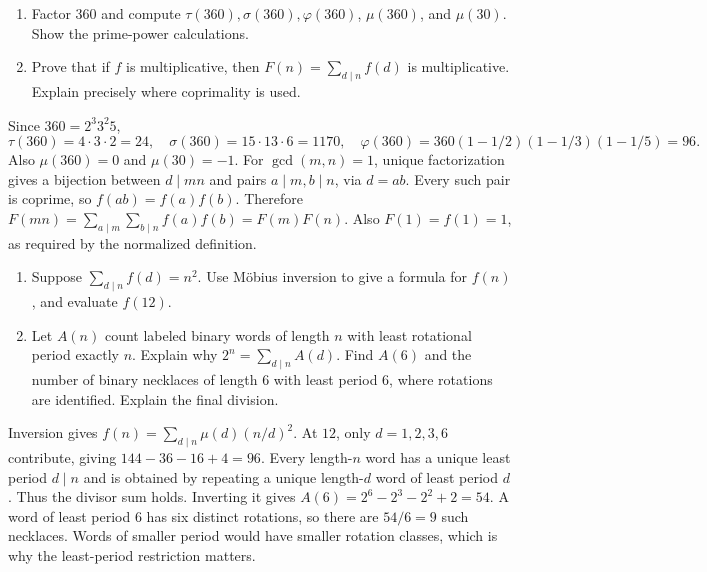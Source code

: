 \begin{enumerate}
\item Factor $360$ and compute $\tau(360),\sigma(360),\varphi(360)$,
$\mu(360)$, and $\mu(30)$. Show the prime-power calculations. 
\item Prove that if $f$ is multiplicative, then
$F(n)=\sum_{d\mid n}f(d)$ is multiplicative. Explain precisely where
coprimality is used. 
\end{enumerate}
\begin{solution}
Since $360=2^3 3^2 5$,
\[
\tau(360)=4\cdot3\cdot2=24,\quad
\sigma(360)=15\cdot13\cdot6=1170,\quad
\varphi(360)=360(1-1/2)(1-1/3)(1-1/5)=96.
\]
Also $\mu(360)=0$ and $\mu(30)=-1$.
For $\gcd(m,n)=1$, unique factorization gives a bijection
between $d\mid mn$ and pairs $a\mid m,b\mid n$, via $d=ab$.
Every such pair is coprime, so $f(ab)=f(a)f(b)$. Therefore
$F(mn)=\sum_{a\mid m}\sum_{b\mid n}f(a)f(b)=F(m)F(n)$.
Also $F(1)=f(1)=1$, as required by the normalized definition.
\end{solution}

\studentbreak
{}
\begin{enumerate}
\item Suppose $\sum_{d\mid n}f(d)=n^2$. Use M\"obius inversion to
give a formula for $f(n)$, and evaluate $f(12)$. 
\item Let $A(n)$ count labeled binary words of length $n$ with least
rotational period exactly $n$. Explain why
$2^n=\sum_{d\mid n}A(d)$. Find $A(6)$ and the number of binary necklaces
of length $6$ with least period $6$, where rotations are identified.
Explain the final division. 
\end{enumerate}
\begin{solution}
Inversion gives $f(n)=\sum_{d\mid n}\mu(d)(n/d)^2$.
At $12$, only $d=1,2,3,6$ contribute, giving $144-36-16+4=96$.
Every length-$n$ word has a unique least period $d\mid n$ and is obtained
by repeating a unique length-$d$ word of least period $d$. Thus the
divisor sum holds. Inverting it gives
$A(6)=2^6-2^3-2^2+2=54$.
A word of least period $6$ has six distinct rotations, so there are
$54/6=9$ such necklaces. Words of smaller period would have smaller
rotation classes, which is why the least-period restriction matters.
\end{solution}

